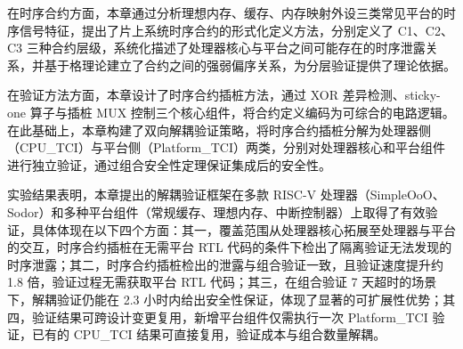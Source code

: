 在时序合约方面，本章通过分析理想内存、缓存、内存映射外设三类常见平台的时序信号特征，提出了片上系统时序合约的形式化定义方法，分别定义了 C1、C2、C3 三种合约层级，系统化描述了处理器核心与平台之间可能存在的时序泄露关系，并基于格理论建立了合约之间的强弱偏序关系，为分层验证提供了理论依据。

在验证方法方面，本章设计了时序合约插桩方法，通过 XOR 差异检测、sticky-one 算子与插桩 MUX 控制三个核心组件，将合约定义编码为可综合的电路逻辑。在此基础上，本章构建了双向解耦验证策略，将时序合约插桩分解为处理器侧（CPU\_TCI）与平台侧（Platform\_TCI）两类，分别对处理器核心和平台组件进行独立验证，通过组合安全性定理保证集成后的安全性。

实验结果表明，本章提出的解耦验证框架在多款 RISC-V 处理器（SimpleOoO、Sodor）和多种平台组件（常规缓存、理想内存、中断控制器）上取得了有效验证，具体体现在以下四个方面：其一，覆盖范围从处理器核心拓展至处理器与平台的交互，时序合约插桩在无需平台 RTL 代码的条件下检出了隔离验证无法发现的时序泄露；其二，时序合约插桩检出的泄露与组合验证一致，且验证速度提升约 1.8 倍，验证过程无需获取平台 RTL 代码；其三，在组合验证 7 天超时的场景下，解耦验证仍能在 2.3 小时内给出安全性保证，体现了显著的可扩展性优势；其四，验证结果可跨设计变更复用，新增平台组件仅需执行一次 Platform\_TCI 验证，已有的 CPU\_TCI 结果可直接复用，验证成本与组合数量解耦。
